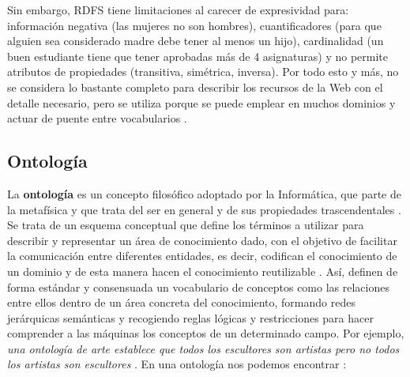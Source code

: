 Sin embargo, RDFS tiene limitaciones al carecer de expresividad para: información negativa (las mujeres no son hombres), cuantificadores (para que alguien sea considerado madre debe tener al menos un hijo), cardinalidad (un buen estudiante tiene que tener aprobadas más de 4 asignaturas) y no permite atributos de propiedades (transitiva, simétrica, inversa). Por todo esto y más, no se considera lo bastante completo para describir los recursos de la Web con el detalle necesario, pero se utiliza porque se puede emplear en muchos dominios y actuar de puente entre vocabularios \cite{aplicacion}.

\subsection{Ontología} %

La \textbf{ontología} es un concepto filosófico adoptado por la Informática, que parte de la metafísica y que trata del ser en general y de sus propiedades trascendentales \cite{apuntes-clase-jose}. Se trata de un esquema conceptual que define los términos a utilizar para describir y representar un área de conocimiento dado, con el objetivo de facilitar la comunicación entre diferentes entidades, es decir, codifican el conocimiento de un dominio y de esta manera hacen el conocimiento reutilizable \cite{tesis}. Así, definen de forma estándar y consensuada un vocabulario de conceptos como las relaciones entre ellos dentro de un área concreta del conocimiento, formando redes jerárquicas semánticas y recogiendo reglas lógicas y restricciones para hacer comprender a las máquinas los conceptos de un determinado campo. Por ejemplo, \textit{una ontología de arte establece que todos los escultores son artistas pero no todos los artistas son escultores} \cite{web-semantica-w3c}. En una ontología nos podemos encontrar \cite{aplicacion, apuntes-clase-jose}:

